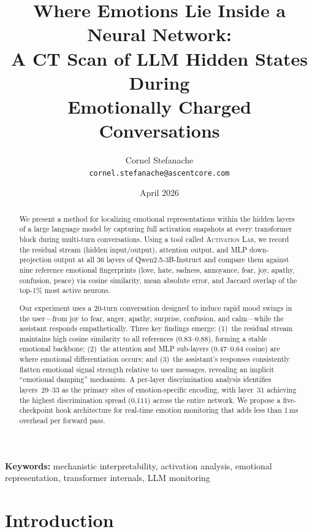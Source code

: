 \documentclass[11pt,a4paper]{article}
\title{%
  \textbf{Where Emotions Lie Inside a Neural Network:\\
  A CT Scan of LLM Hidden States During\\
  Emotionally Charged Conversations}
}
\author{
  Cornel Stefanache\\
  \texttt{cornel.stefanache@ascentcore.com}
}
\date{April 2026}
\begin{document}
\maketitle

\begin{abstract}
We present a method for localizing emotional representations within the hidden layers of a large language model by capturing full activation snapshots at every transformer block during multi-turn conversations. Using a tool called \textsc{Activation Lab}, we record the residual stream (hidden input/output), attention output, and MLP down-projection output at all 36 layers of Qwen2.5-3B-Instruct and compare them against nine reference emotional fingerprints (love, hate, sadness, annoyance, fear, joy, apathy, confusion, peace) via cosine similarity, mean absolute error, and Jaccard overlap of the top-1\% most active neurons.

Our experiment uses a 20-turn conversation designed to induce rapid mood swings in the user—from joy to fear, anger, apathy, surprise, confusion, and calm—while the assistant responds empathetically. Three key findings emerge: (1)~the residual stream maintains high cosine similarity to all references ($0.83$--$0.88$), forming a stable emotional backbone; (2)~the attention and MLP sub-layers ($0.47$--$0.64$ cosine) are where emotional differentiation occurs; and (3)~the assistant's responses consistently flatten emotional signal strength relative to user messages, revealing an implicit ``emotional damping'' mechanism. A per-layer discrimination analysis identifies layers~29--33 as the primary sites of emotion-specific encoding, with layer~31 achieving the highest discrimination spread ($0.111$) across the entire network. We propose a five-checkpoint hook architecture for real-time emotion monitoring that adds less than 1\,ms overhead per forward pass.
\end{abstract}

\vspace{0.5em}
\noindent\textbf{Keywords:} mechanistic interpretability, activation analysis, emotional representation, transformer internals, LLM monitoring

\section{Introduction}
\end{document}
